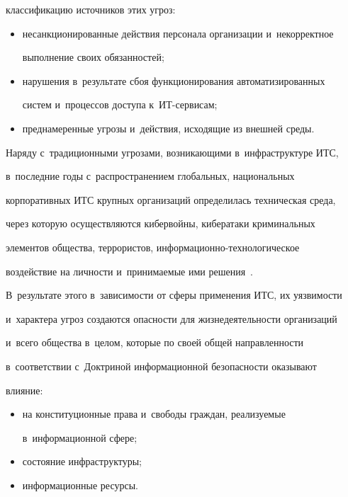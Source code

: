 классификацию источников этих угроз:


  \begin{itemize}


  \item несанкционированные действия персонала организации и~некорректное 


выполнение своих обязанностей;


  \item нарушения в~результате сбоя функционирования автоматизированных 


сис\-тем и~процессов доступа к~ИТ-сервисам;


  \item преднамеренные угрозы и~действия, исходящие из внешней среды.


  \end{itemize}


  


  Наряду с~традиционными угрозами, возникающими в~инфраструктуре ИТС, 


в~последние годы с~распространением глобальных, национальных 


корпоративных ИТС крупных организаций определилась техническая среда, 


через которую осуществляются кибервойны, кибератаки криминальных 


элементов общества, террористов, информационно-технологическое 


воздействие на личности и~принимаемые ими решения~\cite{5-bys}. 


В~результате этого в~зависимости от сферы применения ИТС, их уязвимости 


и~характера угроз создаются опасности для жизнедеятельности организаций 


и~всего общества в~целом, которые по своей общей на\-прав\-лен\-ности 


в~соответствии с~Доктриной информационной безопасности оказывают 


влияние:


  \begin{itemize}


  \item на конституционные права и~свободы граждан, реализуемые 


в~информационной сфере;


  \item состояние инфраструктуры;


  \item информационные ресурсы.


  \end{itemize}


